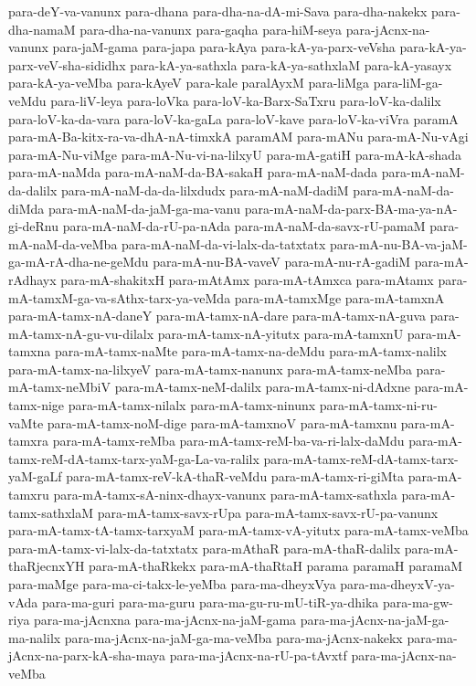 {para-deY-va-vanunx
para-dhana
para-dha-na-dA-mi-Sava
para-dha-nakekx
para-dha-namaM
para-dha-na-vanunx
para-gaqha
para-hiM-seya
para-jAcnx-na-vanunx
para-jaM-gama
para-japa
para-kAya
para-kA-ya-parx-veVsha
para-kA-ya-parx-veV-sha-sididhx
para-kA-ya-sathxla
para-kA-ya-sathxlaM
para-kA-yasayx
para-kA-ya-veMba
para-kAyeV
para-kale
paralAyxM
para-liMga
para-liM-ga-veMdu
para-liV-leya
para-loVka
para-loV-ka-Barx-SaTxru
para-loV-ka-dalilx
para-loV-ka-da-vara
para-loV-ka-gaLa
para-loV-kave
para-loV-ka-viVra
paramA
para-mA-Ba-kitx-ra-va-dhA-nA-timxkA
paramAM
para-mANu
para-mA-Nu-vAgi
para-mA-Nu-viMge
para-mA-Nu-vi-na-lilxyU
para-mA-gatiH
para-mA-kA-shada
para-mA-naMda
para-mA-naM-da-BA-sakaH
para-mA-naM-dada
para-mA-naM-da-dalilx
para-mA-naM-da-da-lilxdudx
para-mA-naM-dadiM
para-mA-naM-da-diMda
para-mA-naM-da-jaM-ga-ma-vanu
para-mA-naM-da-parx-BA-ma-ya-nA-gi-deRnu
para-mA-naM-da-rU-pa-nAda
para-mA-naM-da-savx-rU-pamaM
para-mA-naM-da-veMba
para-mA-naM-da-vi-lalx-da-tatxtatx
para-mA-nu-BA-va-jaM-ga-mA-rA-dha-ne-geMdu
para-mA-nu-BA-vaveV
para-mA-nu-rA-gadiM
para-mA-rAdhayx
para-mA-shakitxH
para-mAtAmx
para-mA-tAmxca
para-mAtamx
para-mA-tamxM-ga-va-sAthx-tarx-ya-veMda
para-mA-tamxMge
para-mA-tamxnA
para-mA-tamx-nA-daneY
para-mA-tamx-nA-dare
para-mA-tamx-nA-guva
para-mA-tamx-nA-gu-vu-dilalx
para-mA-tamx-nA-yitutx
para-mA-tamxnU
para-mA-tamxna
para-mA-tamx-naMte
para-mA-tamx-na-deMdu
para-mA-tamx-nalilx
para-mA-tamx-na-lilxyeV
para-mA-tamx-nanunx
para-mA-tamx-neMba
para-mA-tamx-neMbiV
para-mA-tamx-neM-dalilx
para-mA-tamx-ni-dAdxne
para-mA-tamx-nige
para-mA-tamx-nilalx
para-mA-tamx-ninunx
para-mA-tamx-ni-ru-vaMte
para-mA-tamx-noM-dige
para-mA-tamxnoV
para-mA-tamxnu
para-mA-tamxra
para-mA-tamx-reMba
para-mA-tamx-reM-ba-va-ri-lalx-daMdu
para-mA-tamx-reM-dA-tamx-tarx-yaM-ga-La-va-ralilx
para-mA-tamx-reM-dA-tamx-tarx-yaM-gaLf
para-mA-tamx-reV-kA-thaR-veMdu
para-mA-tamx-ri-giMta
para-mA-tamxru
para-mA-tamx-sA-ninx-dhayx-vanunx
para-mA-tamx-sathxla
para-mA-tamx-sathxlaM
para-mA-tamx-savx-rUpa
para-mA-tamx-savx-rU-pa-vanunx
para-mA-tamx-tA-tamx-tarxyaM
para-mA-tamx-vA-yitutx
para-mA-tamx-veMba
para-mA-tamx-vi-lalx-da-tatxtatx
para-mAthaR
para-mA-thaR-dalilx
para-mA-thaRjecnxYH
para-mA-thaRkekx
para-mA-thaRtaH
parama
paramaH
paramaM
para-maMge
para-ma-ci-takx-le-yeMba
para-ma-dheyxVya
para-ma-dheyxV-ya-vAda
para-ma-guri
para-ma-guru
para-ma-gu-ru-mU-tiR-ya-dhika
para-ma-gw-riya
para-ma-jAcnxna
para-ma-jAcnx-na-jaM-gama
para-ma-jAcnx-na-jaM-ga-ma-nalilx
para-ma-jAcnx-na-jaM-ga-ma-veMba
para-ma-jAcnx-nakekx
para-ma-jAcnx-na-parx-kA-sha-maya
para-ma-jAcnx-na-rU-pa-tAvxtf
para-ma-jAcnx-na-veMba
}
